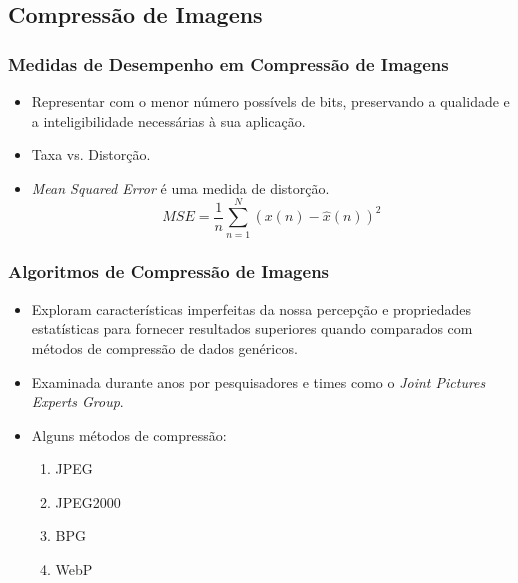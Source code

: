 \documentclass{beamer}
\begin{document}
\subsection{Compressão de Imagens}
\begin{frame}
\frametitle{Medidas de Desempenho em Compressão de Imagens}
\begin{itemize}
    \item Representar com o menor número possívels de bits, preservando a qualidade e a inteligibilidade necessárias à sua aplicação.
    \item Taxa vs. Distorção.
    \item \textit{Mean Squared Error} é uma medida de distorção.
    \begin{equation} MSE = \dfrac{1}{n}\sum_{n=1}^{N}{(x(n) - \hat{x}(n))}^2 \end{equation}
\end{itemize}
\end{frame}
\begin{frame}
\frametitle{Algoritmos de Compressão de Imagens}
\begin{itemize}
    \item Exploram características imperfeitas da nossa percepção e propriedades estatísticas para fornecer resultados superiores quando comparados com métodos de compressão de dados genéricos.
    \item Examinada durante anos por pesquisadores e times como o \textit{Joint Pictures Experts Group}.
    \item Alguns métodos de compressão:
    \begin{enumerate}
    \item JPEG~\cite{jpeg}
    \item JPEG2000~\cite{jpeg2000}
    \item BPG~\cite{bpg}
    \item WebP~\cite{webp}
    \end{enumerate}
\end{itemize}
\end{frame}
\end{document}

